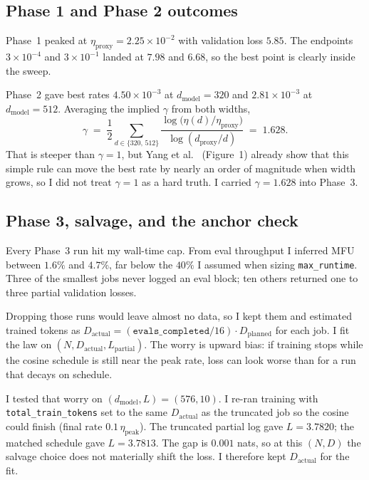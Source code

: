 \documentclass[11pt]{article}
\begin{document}
\subsection{Phase 1 and Phase 2 outcomes}

Phase~1 peaked at $\eta_\text{proxy} = 2.25 \times 10^{-2}$ with validation loss $5.85$. The endpoints $3 \times 10^{-4}$ and $3 \times 10^{-1}$ landed at $7.98$ and $6.68$, so the best point is clearly inside the sweep.

Phase~2 gave best rates $4.50 \times 10^{-3}$ at $d_\text{model} = 320$ and $2.81 \times 10^{-3}$ at $d_\text{model} = 512$. Averaging the implied $\gamma$ from both widths,
\begin{equation}
    \gamma \;=\; \frac{1}{2} \sum_{d \in \{320,\, 512\}} \frac{\log\bigl(\eta(d)/\eta_\text{proxy}\bigr)}{\log(d_\text{proxy}/d)} \;=\; 1.628.
\end{equation}
That is steeper than $\gamma = 1$, but Yang et al.~\cite{yang2022} (Figure~1) already show that this simple rule can move the best rate by nearly an order of magnitude when width grows, so I did not treat $\gamma = 1$ as a hard truth. I carried $\gamma = 1.628$ into Phase~3.

\subsection{Phase 3, salvage, and the anchor check}

Every Phase~3 run hit my wall-time cap. From eval throughput I inferred MFU between $1.6\%$ and $4.7\%$, far below the $40\%$ I assumed when sizing \texttt{max\_runtime}. Three of the smallest jobs never logged an eval block; ten others returned one to three partial validation losses.

Dropping those runs would leave almost no data, so I kept them and estimated trained tokens as $D_\text{actual} = (\texttt{evals\_completed} / 16) \cdot D_\text{planned}$ for each job. I fit the law on $(N, D_\text{actual}, L_\text{partial})$. The worry is upward bias: if training stops while the cosine schedule is still near the peak rate, loss can look worse than for a run that decays on schedule.

I tested that worry on $(d_\text{model}, L) = (576, 10)$. I re-ran training with \texttt{total\_train\_tokens} set to the same $D_\text{actual}$ as the truncated job so the cosine could finish (final rate $0.1\,\eta_\text{peak}$). The truncated partial log gave $L = 3.7820$; the matched schedule gave $L = 3.7813$. The gap is $0.001$ nats, so at this $(N, D)$ the salvage choice does not materially shift the loss. I therefore kept $D_\text{actual}$ for the fit.
\end{document}
